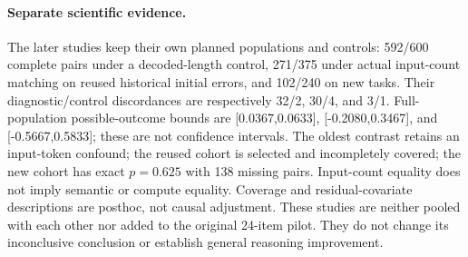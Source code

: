 \paragraph{Separate scientific evidence.}
The later studies keep their own planned populations and controls: 592/600 complete pairs under a decoded-length control, 271/375 under actual input-count matching on reused historical initial errors, and 102/240 on new tasks. Their diagnostic/control discordances are respectively 32/2, 30/4, and 3/1. Full-population possible-outcome bounds are [0.0367,0.0633], [-0.2080,0.3467], and [-0.5667,0.5833]; these are not confidence intervals. The oldest contrast retains an input-token confound; the reused cohort is selected and incompletely covered; the new cohort has exact $p=0.625$ with 138 missing pairs. Input-count equality does not imply semantic or compute equality. Coverage and residual-covariate descriptions are posthoc, not causal adjustment. These studies are neither pooled with each other nor added to the original 24-item pilot. They do not change its inconclusive conclusion or establish general reasoning improvement.
